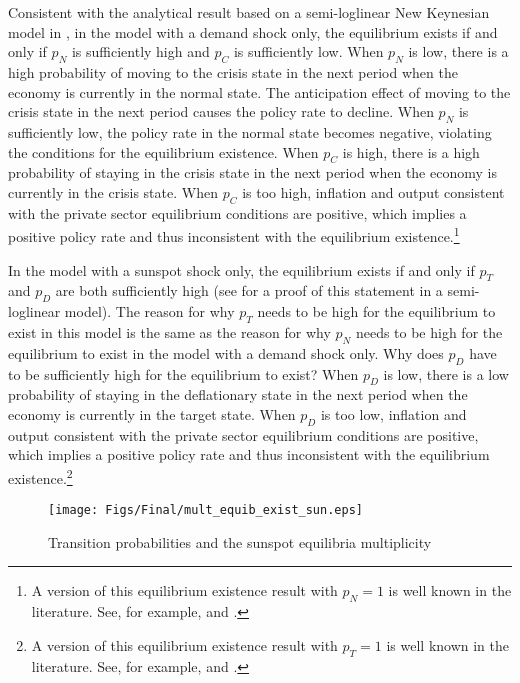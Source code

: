 \documentclass[11pt]{article}
\begin{document}
\begin{singlespace}
		Consistent with the analytical result based on a semi-loglinear New Keynesian model in \citet{NakataSchmidtForthcomingJME}, in the model with a demand shock only, the equilibrium exists if and only if $p_{N}$ is sufficiently high and $p_{C}$ is sufficiently low. When $p_{N}$ is low, there is a high probability of moving to the crisis state in the next period when the economy is currently in the normal state. The anticipation effect of moving to the crisis state in the next period causes the policy rate to decline. When $p_{N}$ is sufficiently low, the policy rate in the normal state becomes negative, violating the conditions for the equilibrium existence. When $p_{C}$ is high, there is a high probability of staying in the crisis state in the next period when the economy is currently in the crisis state. When $p_{C}$ is too high, inflation and output consistent with the private sector equilibrium conditions are positive, which implies a positive policy rate and thus inconsistent with the equilibrium existence.\footnote{A version of this equilibrium existence result with $p_{N}=1$ is well known in the literature. See, for example, \citet{Eggertsson2011} and \citet{BonevaBraunWaki2016}.} 
		
		In the model with a sunspot shock only, the equilibrium exists if and only if $p_{T}$ and $p_{D}$ are both sufficiently high (see \citet{NakataSchmidt2019} for a proof of this statement in a semi-loglinear model). The reason for why $p_{T}$ needs to be high for the equilibrium to exist in this model is the same as the reason for why $p_{N}$ needs to be high for the equilibrium to exist in the model with a demand shock only. Why does $p_{D}$ have to be sufficiently high for the equilibrium to exist? When $p_{D}$ is low, there is a low probability of staying in the deflationary state in the next period when the economy is currently in the target state. When $p_{D}$ is too low, inflation and output consistent with the private sector equilibrium conditions are positive, which implies a positive policy rate and thus inconsistent with the equilibrium existence.\footnote{A version of this equilibrium existence result with $p_{T}=1$ is well known in the literature. See, for example, \citet{MertensRavn2014} and \citet{BonevaBraunWaki2016}.}
	
	    \begin{figure}[!ht]
			\begin{center}
				\caption{Transition probabilities and the sunspot equilibria multiplicity\label{fig:ExistenceMultiplicity}}
	        	\vspace{-1em}
	        	\texttt{[image: Figs/Final/mult\_equib\_exist\_sun.eps]}\\
			\end{center}
	        \vspace{-1em}
		\end{figure}
	

\end{singlespace}
\end{document}
